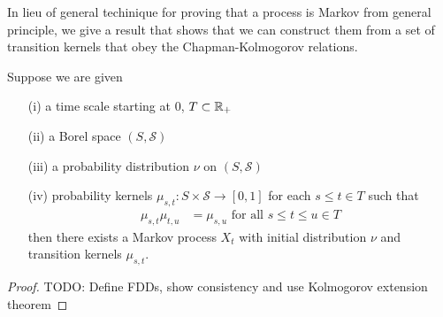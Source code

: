 In lieu of general techinique for proving that a process is Markov
from general principle, we give a result that shows that we can
construct them from a set of transition kernels that obey the Chapman-Kolmogorov relations.
\begin{thm}\label{ExistenceMarkovProcess}Suppose we are given
\begin{itemize}
\item[(i)] a  time scale starting at $0$, $T \subset \mathbb{R}_+$ 
\item[(ii)]a Borel space $(S, \mathcal{S})$ 
\item[(iii)]a probability distribution $\nu$ on $(S, \mathcal{S})$
\item[(iv)]probability kernels $\mu_{s,t} : S \times
  \mathcal{S} \to [0,1]$ for each $s \leq t \in T$ such that 
\begin{align*}
\mu_{s,t} \mu_{t,u} &= \mu_{s,u} \text{ for all $s\leq
  t\leq u \in T$}
\end{align*}
then there exists a Markov process $X_t$ with initial distribution
$\nu$ and transition kernels $\mu_{s,t}$.
\end{itemize} 
\end{thm}
\begin{proof}
TODO: Define FDDs, show consistency and use Kolmogorov extension theorem
\end{proof}

